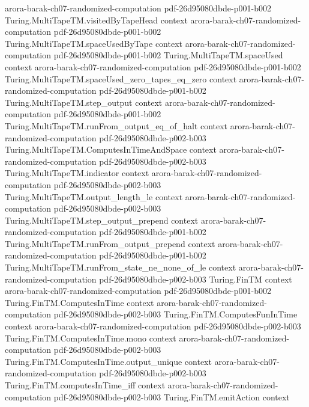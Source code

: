 \begin{theorem}
  {arora-barak-ch07-randomized-computation}
  {pdf-26d95080dbde-p001-b002}
\proofstep
  {Turing.MultiTapeTM.visitedByTapeHead}
  {context}
  {arora-barak-ch07-randomized-computation}
  {pdf-26d95080dbde-p001-b002}
\proofstep
  {Turing.MultiTapeTM.spaceUsedByTape}
  {context}
  {arora-barak-ch07-randomized-computation}
  {pdf-26d95080dbde-p001-b002}
\proofstep
  {Turing.MultiTapeTM.spaceUsed}
  {context}
  {arora-barak-ch07-randomized-computation}
  {pdf-26d95080dbde-p001-b002}
\proofstep
  {Turing.MultiTapeTM.spaceUsed_zero_tapes_eq_zero}
  {context}
  {arora-barak-ch07-randomized-computation}
  {pdf-26d95080dbde-p001-b002}
\proofstep
  {Turing.MultiTapeTM.step_output}
  {context}
  {arora-barak-ch07-randomized-computation}
  {pdf-26d95080dbde-p001-b002}
\proofstep
  {Turing.MultiTapeTM.runFrom_output_eq_of_halt}
  {context}
  {arora-barak-ch07-randomized-computation}
  {pdf-26d95080dbde-p002-b003}
\proofstep
  {Turing.MultiTapeTM.ComputesInTimeAndSpace}
  {context}
  {arora-barak-ch07-randomized-computation}
  {pdf-26d95080dbde-p002-b003}
\proofstep
  {Turing.MultiTapeTM.indicator}
  {context}
  {arora-barak-ch07-randomized-computation}
  {pdf-26d95080dbde-p002-b003}
\proofstep
  {Turing.MultiTapeTM.output_length_le}
  {context}
  {arora-barak-ch07-randomized-computation}
  {pdf-26d95080dbde-p002-b003}
\proofstep
  {Turing.MultiTapeTM.step_output_prepend}
  {context}
  {arora-barak-ch07-randomized-computation}
  {pdf-26d95080dbde-p001-b002}
\proofstep
  {Turing.MultiTapeTM.runFrom_output_prepend}
  {context}
  {arora-barak-ch07-randomized-computation}
  {pdf-26d95080dbde-p001-b002}
\proofstep
  {Turing.MultiTapeTM.runFrom_state_ne_none_of_le}
  {context}
  {arora-barak-ch07-randomized-computation}
  {pdf-26d95080dbde-p002-b003}
\proofstep
  {Turing.FinTM}
  {context}
  {arora-barak-ch07-randomized-computation}
  {pdf-26d95080dbde-p001-b002}
\proofstep
  {Turing.FinTM.ComputesInTime}
  {context}
  {arora-barak-ch07-randomized-computation}
  {pdf-26d95080dbde-p002-b003}
\proofstep
  {Turing.FinTM.ComputesFunInTime}
  {context}
  {arora-barak-ch07-randomized-computation}
  {pdf-26d95080dbde-p002-b003}
\proofstep
  {Turing.FinTM.ComputesInTime.mono}
  {context}
  {arora-barak-ch07-randomized-computation}
  {pdf-26d95080dbde-p002-b003}
\proofstep
  {Turing.FinTM.ComputesInTime.output_unique}
  {context}
  {arora-barak-ch07-randomized-computation}
  {pdf-26d95080dbde-p002-b003}
\proofstep
  {Turing.FinTM.computesInTime_iff}
  {context}
  {arora-barak-ch07-randomized-computation}
  {pdf-26d95080dbde-p002-b003}
\proofstep
  {Turing.FinTM.emitAction}
  {context}

\end{theorem}
